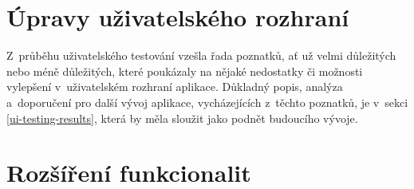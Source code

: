 \section{Úpravy uživatelského rozhraní}

Z~průběhu uživatelského testování vzešla řada poznatků, ať už velmi důležitých nebo méně důležitých, které poukázaly na nějaké nedostatky či možnosti vylepšení v~uživatelském rozhraní aplikace. Důkladný popis, analýza a~doporučení pro další vývoj aplikace, vycházejících z~těchto poznatků, je v~sekci \ref{ui-testing-results}, která by měla sloužit jako podnět budoucího vývoje.

\section{Rozšíření funkcionalit}

